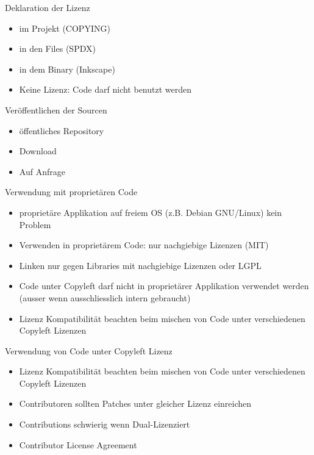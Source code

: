 \begin{frame}{Deklaration der Lizenz}
	\begin{itemize}
		\item im Projekt (COPYING)
		\item in den Files (SPDX)
		\item in dem Binary (Inkscape)
		\item Keine Lizenz: Code darf nicht benutzt werden
	\end{itemize}
\end{frame}

\begin{frame}{Veröffentlichen der Sourcen}
	\begin{itemize}
		\item öffentliches Repository
		\item Download
		\item Auf Anfrage
	\end{itemize}
\end{frame}

\begin{frame}{Verwendung mit proprietären Code}
	\begin{itemize}
		\item proprietäre Applikation auf freiem OS (z.B. Debian GNU/Linux) kein Problem
		\item Verwenden in proprietärem Code: nur nachgiebige Lizenzen (MIT)
		\item Linken nur gegen Libraries mit nachgiebige Lizenzen oder LGPL
		\item Code unter Copyleft darf nicht in proprietärer Applikation verwendet werden (ausser wenn ausschliesslich intern gebraucht)
		\item Lizenz Kompatibilität beachten beim mischen von Code unter verschiedenen Copyleft Lizenzen
	\end{itemize}
\end{frame}

\begin{frame}{Verwendung von Code unter Copyleft Lizenz}
	\begin{itemize}
		\item Lizenz Kompatibilität beachten beim mischen von Code unter verschiedenen Copyleft Lizenzen
		\item Contributoren sollten Patches unter gleicher Lizenz einreichen
		\item Contributions schwierig wenn Dual-Lizenziert
		\item Contributor License Agreement
	\end{itemize}
\end{frame}

